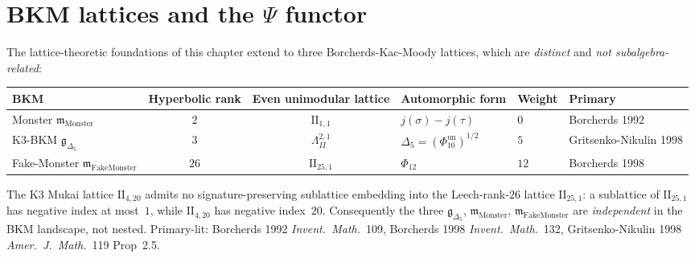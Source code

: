 \section{BKM lattices and the $\Psi$ functor}
\label{sec:latfnd-w17-supplement}

\begin{remark}
\label{rem:latfnd-w17-flagship-table}
The lattice-theoretic foundations of this chapter extend to three
Borcherds-Kac-Moody lattices, which are \emph{distinct}
and \emph{not subalgebra-related}:
\begin{center}
\renewcommand{\arraystretch}{1.3}
\begin{tabular}{@{}lcclll@{}}
\toprule
BKM & Hyperbolic rank & Even unimodular lattice & Automorphic form & Weight & Primary \\
\midrule
Monster $\mathfrak m_{\mathrm{Monster}}$ & $2$ & $\mathrm{II}_{1,1}$ & $j(\sigma)-j(\tau)$ & $0$ & Borcherds 1992 \\
K3-BKM $\mathfrak g_{\Delta_5}$ & $3$ & $\Lambda^{2,1}_{II}$ & $\Delta_5 = (\Phi_{10}^{\mathrm{un}})^{1/2}$ & $5$ & Gritsenko-Nikulin 1998 \\
Fake-Monster $\mathfrak m_{\mathrm{FakeMonster}}$ & $26$ & $\mathrm{II}_{25,1}$ & $\Phi_{12}$ & $12$ & Borcherds 1998 \\
\bottomrule
\end{tabular}
\end{center}
The K3 Mukai lattice $\mathrm{II}_{4,20}$ admits no
signature-preserving sublattice embedding into the Leech-rank-$26$
lattice $\mathrm{II}_{25,1}$: a sublattice of $\mathrm{II}_{25,1}$ has
negative index at most~$1$, while $\mathrm{II}_{4,20}$ has negative
index~$20$. Consequently the three $\mathfrak g_{\Delta_5}$,
$\mathfrak m_{\mathrm{Monster}}$, $\mathfrak m_{\mathrm{FakeMonster}}$
are \emph{independent} in the BKM landscape, not nested. Primary-lit:
Borcherds 1992 \emph{Invent.\ Math.}~109, Borcherds 1998
\emph{Invent.\ Math.}~132, Gritsenko-Nikulin 1998
\emph{Amer.\ J.\ Math.}~119 Prop~2.5.
\end{remark}

